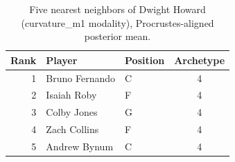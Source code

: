 \begin{table}[htbp]
  \centering\small
  \begin{tabular}{rllc}
    \toprule
    Rank & Player & Position & Archetype \\
    \midrule
    1 & Bruno Fernando & C & 4 \\
    2 & Isaiah Roby & F & 4 \\
    3 & Colby Jones & G & 4 \\
    4 & Zach Collins & F & 4 \\
    5 & Andrew Bynum & C & 4 \\
    \bottomrule
  \end{tabular}
  \caption{Five nearest neighbors of Dwight Howard (curvature_m1 modality), Procrustes-aligned posterior mean.}
  \label{tab:Dwight_Howard_neighbors_curvature_m1}
\end{table}

